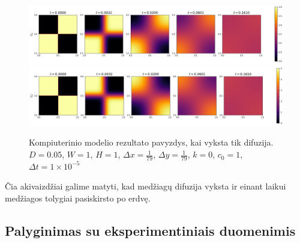 \begin{figure}[h!]
\centering
\includegraphics[width=\textwidth]{../assets/only-diffusion-c1.png} \\
\includegraphics[width=\textwidth]{../assets/only-diffusion-c2.png}
\caption{Kompiuterinio modelio rezultato pavyzdys, kai vyksta tik difuzija. $D = 0.05$, $W = 1$, $H = 1$, $\Delta x = \frac{1}{79}$, $\Delta y = \frac{1}{79}$, $k = 0$, $c_0 = 1$, $\Delta t = 1\times 10^{-5}$ }
\label{result-example}
\end{figure}

Čia akivaizdžiai galime matyti, kad medžiagų difuzija vyksta ir einant laikui medžiagos tolygiai pasiskirsto po erdvę.

\newpage
\subsection{Palyginimas su eksperimentiniais duomenimis}


